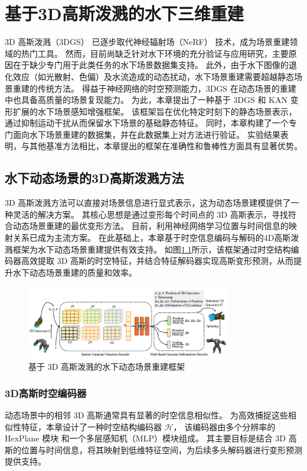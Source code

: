 
\chapter{基于3D高斯泼溅的水下三维重建}
3D 高斯泼溅（3DGS）\cite{3DGS} 已逐步取代神经辐射场（NeRF）\cite{nerf} 技术，成为场景重建领域的热门工具。
然而，目前尚缺乏针对水下环境的充分验证与应用研究，主要原因在于缺少专门用于此类任务的水下场景数据集支持。
此外，由于水下图像的退化效应（如光散射、色偏）及水流造成的动态扰动，水下场景重建需要超越静态场景重建的传统方法。
得益于神经网络的时空预测能力，3DGS 在动态场景的重建中也具备高质量的场景复现能力。
为此，本章提出了一种基于 3DGS 和 KAN \cite{kan}变形扩展的水下场景感知增强框架。
该框架旨在优化特定时刻下的静态场景表示，通过抑制运动干扰从而保留水下场景的基础静态特征。
同时，本章构建了一个专门面向水下场景重建的数据集，并在此数据集上对方法进行验证。
实验结果表明，与其他基准方法相比，本章提出的框架在准确性和鲁棒性方面具有显著优势。

\section{水下动态场景的3D高斯泼溅方法} \label{sec:4dgs}
3D 高斯泼溅方法可以直接对场景信息进行显式表示，这为动态场景建模提供了一种灵活的解决方案。
其核心思想是通过变形每个时间点的 3D 高斯表示，寻找符合动态场景重建的最优变形方法。
目前，利用神经网络学习位置与时间信息的映射关系已成为主流方案。
在此基础上，本章基于时空信息编码与解码的4D高斯泼溅\cite{4DGS}框架为水下动态场景重建提供有效支持。
如图\ref{img:4dgs}所示，该框架通过时空结构编码器高效提取 3D 高斯的时空特征，并结合特征解码器实现高斯变形预测，从而提升水下动态场景重建的质量和效率。
\begin{figure}[htbp]
    \centering
    \includegraphics[width=0.8\textwidth]{figures/ch4/4dgs.jpg}
    \caption{基于 3D 高斯泼溅的水下动态场景重建框架}
    \label{img:4dgs}
\end{figure}

\subsection{3D高斯时空编码器}
动态场景中的相邻 3D 高斯通常具有显著的时空信息相似性。
为高效捕捉这些相似性特征，本章设计了一种时空结构编码器 $\mathcal{H}$，
该编码器由多个分辨率的 HexPlane 模块\cite{hex_plane} 和一个多层感知机（MLP）模块组成。
其主要目标是结合 3D 高斯的位置与时间信息，将其映射到低维特征空间，为后续多头解码器进行变形预测提供支持。

